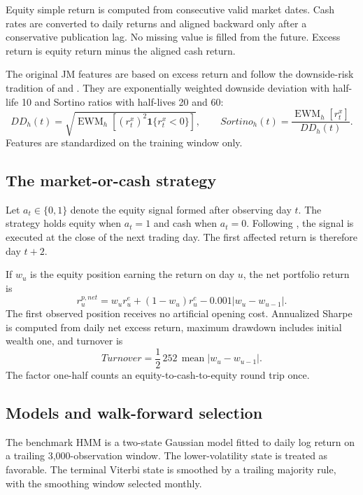 \documentclass[11pt]{article}
\newcommand{\ind}{\mathbf{1}}
\begin{document}
Equity simple return is computed from consecutive valid market dates. Cash rates are converted to daily returns and aligned backward only after a conservative publication lag. No missing value is filled from the future. Excess return is equity return minus the aligned cash return.

The original JM features are based on excess return and follow the downside-risk tradition of \citet{roy1952} and \citet{markowitz1959}. They are exponentially weighted downside deviation with half-life 10 and Sortino ratios with half-lives 20 and 60:
\begin{equation}
DD_h(t)=\sqrt{\operatorname{EWM}_h\!\left[(r_t^x)^2\ind\{r_t^x<0\}\right]},
\qquad
Sortino_h(t)=\frac{\operatorname{EWM}_h[r_t^x]}{DD_h(t)}.
\end{equation}
Features are standardized on the training window only.

\subsection{The market-or-cash strategy}

Let $a_t\in\{0,1\}$ denote the equity signal formed after observing day $t$. The strategy holds equity when $a_t=1$ and cash when $a_t=0$. Following \citet{shu2024}, the signal is executed at the close of the next trading day. The first affected return is therefore day $t+2$.

If $w_u$ is the equity position earning the return on day $u$, the net portfolio return is
\begin{equation}
r^{p,net}_u=w_u r^e_u+(1-w_u)r^c_u-0.001\lvert w_u-w_{u-1}\rvert.
\end{equation}
The first observed position receives no artificial opening cost. Annualized Sharpe is computed from daily net excess return, maximum drawdown includes initial wealth one, and turnover is
\begin{equation}
Turnover=\frac{1}{2}\,252\,\operatorname{mean}\lvert w_u-w_{u-1}\rvert.
\end{equation}
The factor one-half counts an equity-to-cash-to-equity round trip once.

\subsection{Models and walk-forward selection}

The benchmark HMM is a two-state Gaussian model fitted to daily log return on a trailing 3,000-observation window. The lower-volatility state is treated as favorable. The terminal Viterbi state is smoothed by a trailing majority rule, with the smoothing window selected monthly.
\end{document}
